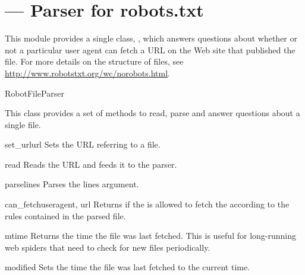 \section{ --- 
         Parser for robots.txt}



This module provides a single class, , which answers
questions about whether or not a particular user agent can fetch a URL on
the Web site that published the  file.  For more details on 
the structure of  files, see
\url{http://www.robotstxt.org/wc/norobots.html}. 

\begin{classdesc}{RobotFileParser}{}

This class provides a set of methods to read, parse and answer questions
about a single  file.

\begin{methoddesc}{set_url}{url}
Sets the URL referring to a  file.
\end{methoddesc}

\begin{methoddesc}{read}{}
Reads the  URL and feeds it to the parser.
\end{methoddesc}

\begin{methoddesc}{parse}{lines}
Parses the lines argument.
\end{methoddesc}

\begin{methoddesc}{can_fetch}{useragent, url}
Returns  if the  is allowed to fetch the 
according to the rules contained in the parsed  file.
\end{methoddesc}

\begin{methoddesc}{mtime}{}
Returns the time the  file was last fetched.  This is
useful for long-running web spiders that need to check for new
 files periodically.
\end{methoddesc}

\begin{methoddesc}{modified}{}
Sets the time the  file was last fetched to the current
time.
\end{methoddesc}

\end{classdesc}

